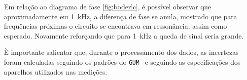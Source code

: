   Em relação ao diagrama de fase \ref{fig:boderlc}, é possível observar que aproximadamente em \SI{1}{\kilo\hertz}, a diferença de fase se anula, mostrado que para frequências próximas o circuito se encontrava em ressonância, assim como esperado. Novamente reforçando que para \SI{1}{\kilo\hertz} a queda de sinal seria grande.
  
  È importante salientar que, durante o processamento dos dados, as incertezas foram calculadas seguindo os padrões do \texttt{GUM}~\cite{ref:gum} e seguindo as especificações dos aparelhos utilizados nas medições.